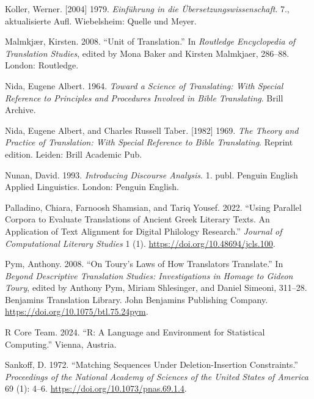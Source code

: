\documentclass[
  letterpaper,
  DIV=11,
  numbers=noendperiod]{scrartcl}
\newlength{\cslhangindent}
\newenvironment{CSLReferences}[2] %
 {\begin{list}{}{%
  \setlength{\itemindent}{0pt}
  \setlength{\leftmargin}{0pt}
  \setlength{\parsep}{0pt}
  \ifodd #1
   \setlength{\leftmargin}{\cslhangindent}
   \setlength{\itemindent}{-1\cslhangindent}
  \fi
  \setlength{\itemsep}{#2\baselineskip}}}
 {\end{list}}
\begin{document}
\begin{CSLReferences}{1}{0}
Koller, Werner. {[}2004{]} 1979. \emph{{Einf{ü}hrung in die
{Ü}bersetzungswissenschaft}}. 7., aktualisierte Aufl. Wiebelsheim:
Quelle und Meyer.

Malmkjær, Kirsten. 2008. {``Unit of {Translation}.''} In \emph{Routledge
{Encyclopedia} of {Translation Studies}}, edited by Mona Baker and
Kirsten Malmkjaer, 286--88. London: Routledge.

Nida, Eugene Albert. 1964. \emph{Toward a {Science} of {Translating}:
{With Special Reference} to {Principles} and {Procedures Involved} in
{Bible Translating}}. Brill Archive.

Nida, Eugene Albert, and Charles Russell Taber. {[}1982{]} 1969.
\emph{The {Theory} and {Practice} of {Translation}: {With Special
Reference} to {Bible Translating}}. Reprint edition. Leiden: Brill
Academic Pub.

Nunan, David. 1993. \emph{Introducing Discourse Analysis}. 1. publ.
Penguin {English} Applied Linguistics. London: Penguin English.

Palladino, Chiara, Farnoosh Shamsian, and Tariq Yousef. 2022. {``Using
{Parallel Corpora} to {Evaluate Translations} of {Ancient Greek Literary
Texts}. {An Application} of {Text Alignment} for {Digital Philology
Research}.''} \emph{Journal of Computational Literary Studies} 1 (1).
\url{https://doi.org/10.48694/jcls.100}.

Pym, Anthony. 2008. {``On {Toury}'s Laws of How Translators
Translate.''} In \emph{Beyond {Descriptive Translation Studies}:
{Investigations} in Homage to {Gideon Toury}}, edited by Anthony Pym,
Miriam Shlesinger, and Daniel Simeoni, 311--28. Benjamins {Translation
Library}. John Benjamins Publishing Company.
\url{https://doi.org/10.1075/btl.75.24pym}.

R Core Team. 2024. {``R: {A Language} and {Environment} for {Statistical
Computing}.''} Vienna, Austria.

Sankoff, D. 1972. {``Matching Sequences Under Deletion-Insertion
Constraints.''} \emph{Proceedings of the National Academy of Sciences of
the United States of America} 69 (1): 4--6.
\url{https://doi.org/10.1073/pnas.69.1.4}.


\end{CSLReferences}
\end{document}
